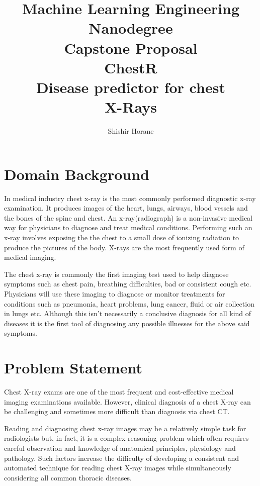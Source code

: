 \documentclass{article}
\begin{document}
    \title{\vspace{-3em}
        Machine Learning Engineering Nanodegree \\
        \large Capstone Proposal \\
        \huge ChestR \\
        \large Disease predictor for chest \\
        X-Rays} 
    \author{Shishir Horane}

    \maketitle 

    \section{Domain Background}

    In medical industry chest x-ray is the most commonly performed diagnostic x-ray examination. It produces images of the heart, lungs, airways, blood vessels and the bones of the spine and chest. An x-ray(radiograph) is a non-invasive medical way for physicians to diagnose and treat medical conditions. Performing such an x-ray involves exposing the the chest to a small dose of ionizing radiation to produce the pictures of the body. X-rays are the most frequently used form of medical imaging. 
    
    The chest x-ray is commonly the first imaging test used to help diagnose symptoms such as chest pain, breathing difficulties, bad or consistent cough etc. Physicians will use these imaging to diagnose or monitor treatments for conditions such as pneumonia, heart problems, lung cancer, fluid or air collection in lungs etc. Although this isn't necessarily a conclusive diagnosis for all kind of diseases it is the first tool of diagnosing any possible illnesses for the above said symptoms.\cite{xray-details} 

    \section{Problem Statement}
    Chest X-ray exams are one of the most frequent and cost-effective medical imaging examinations available. However, clinical diagnosis of a chest X-ray can be challenging and sometimes more difficult than diagnosis via chest CT.\cite{nih-kaggle}
    
    Reading and diagnosing chest x-ray images may be a relatively simple task for radiologists but, in fact, it is a complex reasoning problem which often requires careful observation and knowledge of anatomical principles, physiology and pathology. Such factors increase the difficulty of developing a consistent and automated technique for reading chest X-ray images while simultaneously considering all common thoracic diseases.\cite{nih-gov-xray-release}
\end{document}
